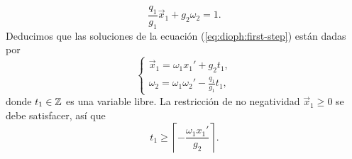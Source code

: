 \begin{equation*}
	\frac{q_1}{g_1}\vec{x}_1 + g_2\omega_2 = 1.
\end{equation*}
Deducimos que las soluciones de la ecuación (\ref{eq:dioph:first-step}) están dadas por
\begin{equation*}
	\begin{cases}
		\vec{x}_1 = \omega_1x_1' + g_2t_1, \\
		\omega_2 = \omega_1\omega_2' - \frac{q_1}{g_1}t_1,
	\end{cases}
\end{equation*}
donde $t_1 \in \mathbb{Z}$ es una variable libre. La restricción de no negatividad $\vec{x}_1 \geq 0$ se debe
satisfacer, así que
\begin{equation*}
	t_1 \geq \left\lceil -\frac{\omega_1x_1'}{g_2} \right\rceil.
\end{equation*}

